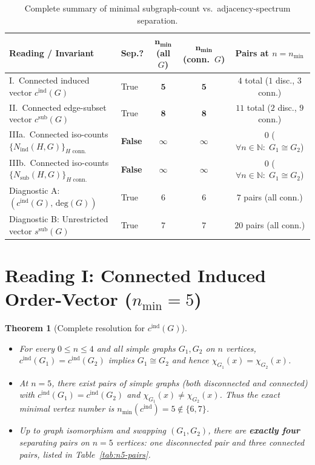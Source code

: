 \documentclass[11pt]{article}
\newtheorem{theorem}{Theorem}[section]
\theoremstyle{definition}
\newcommand{\cind}{c^{\mathrm{ind}}}
\newcommand{\csub}{c^{\mathrm{sub}}}
\newcommand{\ssub}{s^{\mathrm{sub}}}
\newcommand{\Nind}{N_{\mathrm{ind}}}
\newcommand{\Nsub}{N_{\mathrm{sub}}}
\begin{document}
\begin{table}[ht]
\centering
\footnotesize
\setlength{\tabcolsep}{3.8pt}
\caption{Complete summary of minimal subgraph-count vs.\ adjacency-spectrum separation.}
\label{tab:grand-summary}
\begin{tabular}{@{}llccc@{}}
\toprule
\textbf{Reading / Invariant} & \textbf{Sep.?} & $\mathbf{n_{\min}}$ \textbf{(all $G$)} & $\mathbf{n_{\min}}$ \textbf{(conn.\ $G$)} & \textbf{Pairs at $n = n_{\min}$} \\
\midrule
I.\ Connected induced vector $\cind(G)$ & True & $\mathbf{5}$ & $\mathbf{5}$ & $4$ total ($1$ disc., $3$ conn.) \\
II.\ Connected edge-subset vector $\csub(G)$ & True & $\mathbf{8}$ & $\mathbf{8}$ & $11$ total ($2$ disc., $9$ conn.) \\
IIIa.\ Connected iso-counts $\{\Nind(H,G)\}_{H\text{ conn.}}$ & \textbf{False} & $\infty$ & $\infty$ & $0$ ($\forall n \in \mathbb{N}:\; G_1 \cong G_2$) \\
IIIb.\ Connected iso-counts $\{\Nsub(H,G)\}_{H\text{ conn.}}$ & \textbf{False} & $\infty$ & $\infty$ & $0$ ($\forall n \in \mathbb{N}:\; G_1 \cong G_2$) \\
\midrule
Diagnostic A: $(\cind(G),\, \mathrm{deg}(G))$ & True & $6$ & $6$ & $7$ pairs (all conn.) \\
Diagnostic B: Unrestricted vector $\ssub(G)$ & True & $7$ & $7$ & $20$ pairs (all conn.) \\
\bottomrule
\end{tabular}
\end{table}

\section{Reading I: Connected Induced Order-Vector (\texorpdfstring{$n_{\min} = 5$}{n\_min = 5})}

\begin{theorem}[Complete resolution for $\cind(G)$]
\label{thm:reading-I}
\leavevmode
\begin{itemize}
  \item[(a)] For every $0 \le n \le 4$ and all simple graphs $G_1, G_2$ on $n$ vertices, $\cind(G_1) = \cind(G_2)$ implies $G_1 \cong G_2$ and hence $\chi_{G_1}(x) = \chi_{G_2}(x)$.
  \item[(b)] At $n = 5$, there exist pairs of simple graphs (both disconnected and connected) with $\cind(G_1) = \cind(G_2)$ and $\chi_{G_1}(x) \ne \chi_{G_2}(x)$. Thus the exact minimal vertex number is $n_{\min}(\cind) = 5 \notin \{6, 7\}$.
  \item[(c)] Up to graph isomorphism and swapping $(G_1, G_2)$, there are \textbf{exactly four} separating pairs on $n = 5$ vertices: one disconnected pair and three connected pairs, listed in Table~\ref{tab:n5-pairs}.
\end{itemize}
\end{theorem}
\end{document}
